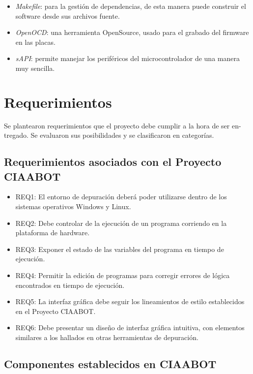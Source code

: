 \begin{itemize}
	\item \emph{Makefile}\citep{makefile}: para la gestión de dependencias, de esta manera puede construir
	el software desde sus archivos fuente.	
	\item \emph{OpenOCD}\citep{openocd}: una herramienta OpenSource, usado para el grabado del firmware
	en las placas.
	\item \emph{sAPI}\citep{sAPI}: permite manejar los periféricos del microcontrolador de una manera
	muy sencilla.
\end{itemize}


\section{Requerimientos}
\label{sec:ejemplo}

Se plantearon requerimientos que el proyecto debe cumplir a la hora de ser en-
tregado. Se evaluaron sus posibilidades y se clasificaron en categorías.

\subsection{Requerimientos asociados con el Proyecto CIAABOT}

\begin{itemize}
\item
REQ1: El entorno de depuración deberá poder utilizarse dentro de los sistemas operativos Windows y Linux.
\item
REQ2: Debe controlar de la ejecución de un programa corriendo en la plataforma de hardware.
\item
REQ3: Exponer el estado de las variables del programa en tiempo de ejecución.
\item
REQ4: Permitir la edición de programas para corregir errores de lógica encontrados en tiempo de ejecución.
\item
REQ5: La interfaz gráfica debe seguir los lineamientos de estilo establecidos en el Proyecto CIAABOT.
\item
REQ6: Debe presentar un diseño de interfaz gráfica intuitiva, con elementos similares a los hallados en otras herramientas de depuración.
\end{itemize}

\subsection{Componentes establecidos en CIAABOT}

